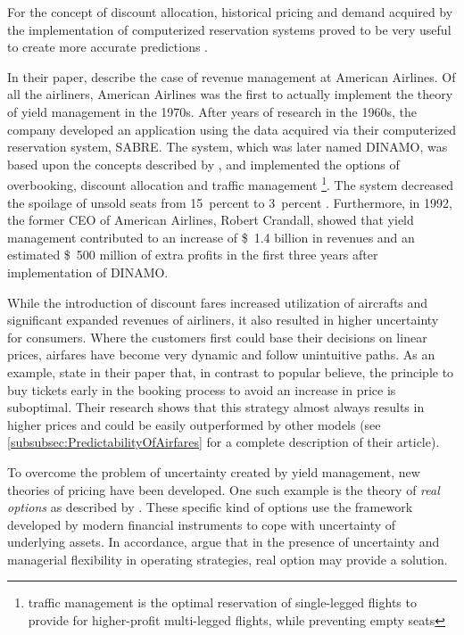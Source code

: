 For the concept of discount allocation, historical pricing and demand acquired by the implementation of computerized reservation systems proved to be very useful to create more accurate predictions \cite{littlewood1972forecasting}.

In their paper,  describe the case of revenue management at American Airlines. Of all the airliners, American Airlines was the first to actually implement the theory of yield management in the 1970s. After years of research in the 1960s, the company developed an application using the data acquired via their computerized reservation system, SABRE. The system, which was later named DINAMO, was based upon the concepts described by , and implemented the options of overbooking, discount allocation and traffic management \footnote{traffic management is the optimal reservation of single-legged flights to provide for higher-profit multi-legged flights, while preventing empty seats}. The system decreased the spoilage of unsold seats from 15~percent to 3~percent \cite{smith1992yield}. Furthermore, in 1992, the former CEO of American Airlines, Robert Crandall, showed that yield management contributed to an increase of \$~1.4 billion in revenues and an estimated \$~500 million of extra profits in the first three years after implementation of DINAMO.

While the introduction of discount fares increased utilization of aircrafts and significant expanded revenues of airliners, it also resulted in higher uncertainty for consumers. Where the customers first could base their decisions on linear prices, airfares have become very dynamic and follow unintuitive paths. As an example,  state in their paper that, in contrast to popular believe, the principle to buy tickets early in the booking process to avoid an increase in price is suboptimal. Their research shows that this strategy almost always results in higher prices and could be easily outperformed by other models (see \autoref{subsubsec:PredictabilityOfAirfares} for a complete description of their article).

To overcome the problem of uncertainty created by yield management, new theories of pricing have been developed. One such example is the theory of \emph{real options} as described by . These specific kind of options use the framework developed by modern financial instruments to cope with uncertainty of underlying assets. In accordance,  argue that in the presence of uncertainty and managerial flexibility in operating strategies, real option may provide a solution.

